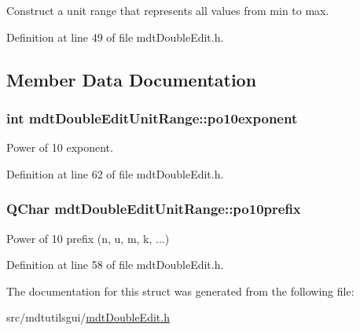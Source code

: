 Construct a unit range that represents all values from min to max. 



Definition at line 49 of file mdt\-Double\-Edit.\-h.



\subsection{Member Data Documentation}
\hypertarget{structmdt_double_edit_unit_range_abfada8b44a3969939cc2ecda49fbe688}{
\subsubsection[{po10exponent}]{\setlength{\rightskip}{0pt plus 5cm}int mdt\-Double\-Edit\-Unit\-Range\-::po10exponent}}\label{structmdt_double_edit_unit_range_abfada8b44a3969939cc2ecda49fbe688}


Power of 10 exponent. 



Definition at line 62 of file mdt\-Double\-Edit.\-h.

\hypertarget{structmdt_double_edit_unit_range_a81d58c1c153dcb56b203d293622ea82e}{
\subsubsection[{po10prefix}]{\setlength{\rightskip}{0pt plus 5cm}Q\-Char mdt\-Double\-Edit\-Unit\-Range\-::po10prefix}}\label{structmdt_double_edit_unit_range_a81d58c1c153dcb56b203d293622ea82e}


Power of 10 prefix (n, u, m, k, ...) 



Definition at line 58 of file mdt\-Double\-Edit.\-h.



The documentation for this struct was generated from the following file\-:\begin{DoxyCompactItemize}
\item 
src/mdtutilsgui/\hyperlink{mdt_double_edit_8h}{mdt\-Double\-Edit.\-h}\end{DoxyCompactItemize}
